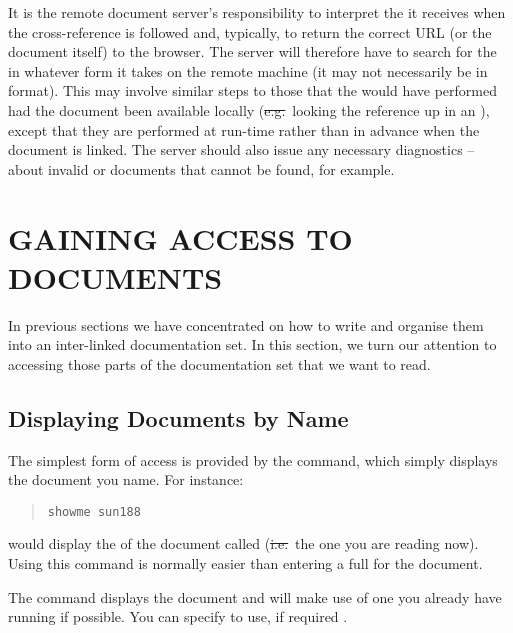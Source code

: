 It is the remote document server's responsibility to interpret the
 it receives when the cross-reference is followed and,
typically, to return the correct URL (or the document itself) to the
browser.  The server will therefore have to search for the
 in whatever form it takes on the remote machine (it
may not necessarily be in  format).  This may involve
similar steps to those that the   would
have performed had the document been available locally
(\st{e.g.}\ looking the reference up in an ),
except that they are performed at run-time rather than in advance when
the document is linked. The server should also issue any necessary
diagnostics -- about invalid  or documents that cannot
be found, for example.

\section{\label{sect:accessingdocuments}GAINING ACCESS TO DOCUMENTS}

In previous sections we have concentrated on how to write
 and organise
them into an inter-linked documentation set. In this section, we turn
our attention to accessing those parts of the documentation set that
we want to read.

\subsection{\label{sect:accessingbyname}Displaying Documents by Name}

The simplest form of 
access is provided by the  command, which
simply displays the document you name. For instance:

\begin{quote}
\begin{verbatim}
showme sun188
\end{verbatim}
\end{quote}

would display the  of the
document called  (\st{i.e.}\ the one you
are reading now).  Using this command is normally easier than entering
a full  for the document.

The  command displays the document  and will make use of one you already
have running if possible. You can specify  to use, if required
.

